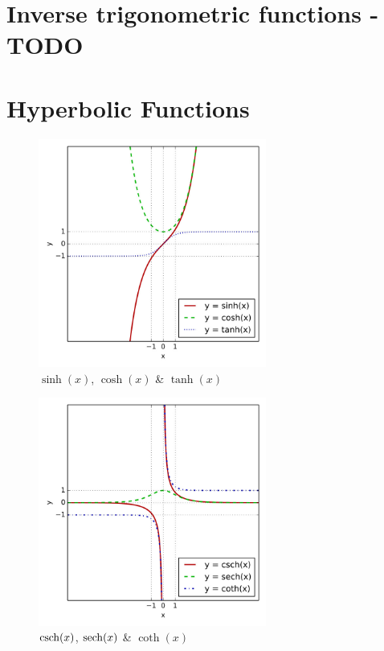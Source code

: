 \section{Inverse trigonometric functions - TODO \cite{wiki-Inverse_trigonometric_functions}}\label{Inverse trigonometric functions}

\section{Hyperbolic Functions \cite{wiki-Hyperbolic_functions}}\label{Hyperbolic_functions}


\begin{table}[H]
    \centering
    \begin{minipage}[t]{0.45\linewidth}
        \begin{figure}[H]
            \centering
            \includegraphics[height=7.5cm]{Pictures/maths/Sinh_cosh_tanh.jpg}
            \caption{$\sinh(x)$, $\cosh(x)$ \& $\tanh(x)$}
        \end{figure}        
    \end{minipage}
    \hfill
    \begin{minipage}[t]{0.45\linewidth}
        \begin{figure}[H]
            \centering
            \includegraphics[height=7.5cm]{Pictures/maths/Csch_sech_coth.jpg}
            \caption{$\operatorname{csch}(x)$, $\operatorname{sech}(x)$ \& $\coth(x)$}
        \end{figure}
    \end{minipage}
\end{table}

